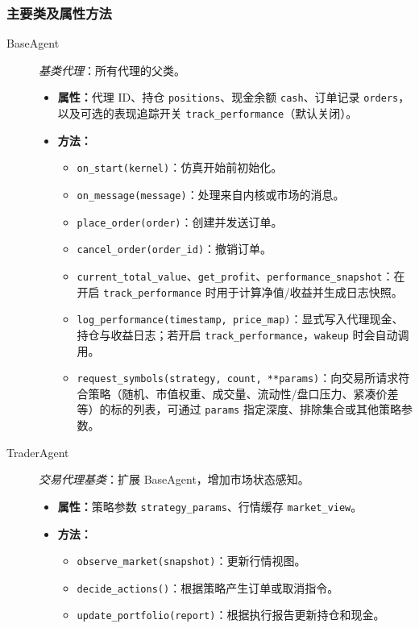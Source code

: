 \subsubsection{主要类及属性方法}
\begin{description}
  \item[BaseAgent] \emph{基类代理}：所有代理的父类。
  \begin{itemize}
    \item \textbf{属性：}代理 ID、持仓 \verb|positions|、现金余额 \verb|cash|、订单记录 \verb|orders|，以及可选的表现追踪开关 \verb|track_performance|（默认关闭）。
    \item \textbf{方法：}
      \begin{itemize}
        \item \verb|on_start(kernel)|：仿真开始前初始化。
        \item \verb|on_message(message)|：处理来自内核或市场的消息。
        \item \verb|place_order(order)|：创建并发送订单。
        \item \verb|cancel_order(order_id)|：撤销订单。
        \item \verb|current_total_value|、\verb|get_profit|、\verb|performance_snapshot|：在开启 \verb|track_performance| 时用于计算净值/收益并生成日志快照。
        \item \verb|log_performance(timestamp, price_map)|：显式写入代理现金、持仓与收益日志；若开启 \verb|track_performance|，\verb|wakeup| 时会自动调用。
        \item \verb|request_symbols(strategy, count, **params)|：向交易所请求符合策略（随机、市值权重、成交量、流动性/盘口压力、紧凑价差等）的标的列表，可通过 \verb|params| 指定深度、排除集合或其他策略参数。
      \end{itemize}
  \end{itemize}
  \item[TraderAgent] \emph{交易代理基类}：扩展 BaseAgent，增加市场状态感知。
  \begin{itemize}
    \item \textbf{属性：}策略参数 \verb|strategy_params|、行情缓存 \verb|market_view|。
    \item \textbf{方法：}
      \begin{itemize}
        \item \verb|observe_market(snapshot)|：更新行情视图。
        \item \verb|decide_actions()|：根据策略产生订单或取消指令。
        \item \verb|update_portfolio(report)|：根据执行报告更新持仓和现金。

\end{itemize}
\end{itemize}
\end{description}
